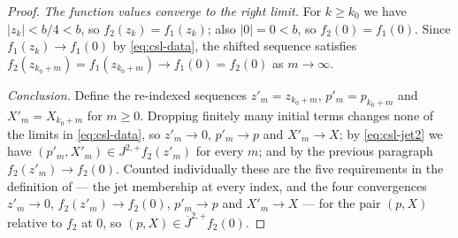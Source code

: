 \begin{proof}
\emph{The function values converge to the right limit.}
For $k\ge k_0$ we have $|z_k|<b/4<b$, so $f_2(z_k)=f_1(z_k)$; also $|0|=0<b$, so
$f_2(0)=f_1(0)$. Since $f_1(z_k)\to f_1(0)$ by \eqref{eq:csl-data}, the shifted
sequence satisfies $f_2(z_{k_0+m})=f_1(z_{k_0+m})\to f_1(0)=f_2(0)$ as
$m\to\infty$.

\emph{Conclusion.}
Define the re-indexed sequences $z'_m=z_{k_0+m}$, $p'_m=p_{k_0+m}$ and
$X'_m=X_{k_0+m}$ for $m\ge0$. Dropping finitely many initial terms changes none
of the limits in \eqref{eq:csl-data}, so $z'_m\to0$, $p'_m\to p$ and
$X'_m\to X$; by \eqref{eq:csl-jet2} we have $(p'_m,X'_m)\in J^{2,+}f_2(z'_m)$
for every $m$; and by the previous paragraph $f_2(z'_m)\to f_2(0)$. Counted
individually these are the five requirements in the definition of
 --- the jet membership at every index, and the four
convergences $z'_m\to0$, $f_2(z'_m)\to f_2(0)$, $p'_m\to p$ and $X'_m\to X$ ---
for the pair $(p,X)$ relative to $f_2$ at $0$, so
$(p,X)\in\overline J^{2,+}f_2(0)$.
\end{proof}
